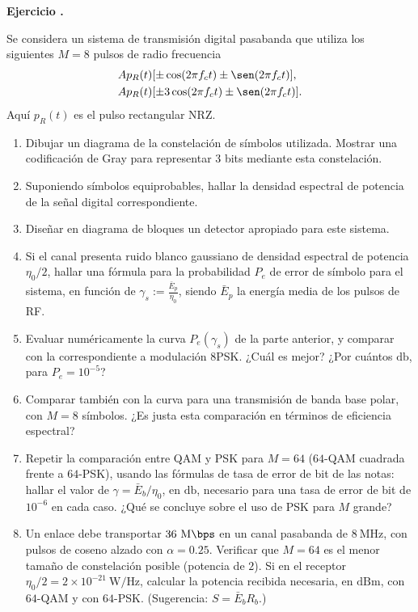\documentclass[a4paper,11pt]{article}
\newcounter{numejer}[section]
\newenvironment{ejercicio}[1][]{
\refstepcounter{numejer}
\noindent \large \textbf{Ejercicio \arabic{section}.\arabic{numejer}} \ifthenelse{\equal{#1}{}}{}{\emph{(#1)}}

\smallskip
}{
\bigskip
}
\begin{document}
\begin{ejercicio}
Se considera un sistema de transmisión digital pasabanda que utiliza los siguientes $M=8$ pulsos de radio frecuencia 
\begin{align*} & A p_R(t)[\pm \cos(2\pi f_c t) \pm \sen(2\pi f_c t)],\\ & A p_R(t)[\pm 3\cos(2\pi f_c t)
\pm \sen(2\pi f_c t)].
\end{align*}
Aquí $p_R(t)$ es el pulso rectangular NRZ. 

\begin{enumerate}
\item Dibujar un diagrama de la constelación de símbolos
utilizada. Mostrar una codificación de Gray para representar 3
bits mediante esta constelación.
\item Suponiendo símbolos equiprobables, hallar la densidad
espectral de potencia de la señal digital correspondiente.
\item Diseñar en diagrama de bloques un detector apropiado para este sistema.
\item Si el canal presenta ruido blanco gaussiano de densidad espectral de
potencia $\eta_0/2$, hallar una fórmula para la probabilidad $P_e$
de error de símbolo para el sistema, en función de
$\gamma_s:=\frac{\bar{E}_p}{\eta_0}$, siendo $\bar{E}_p$ la energía
media de los pulsos de RF.
\item Evaluar numéricamente la curva $P_e(\gamma_s)$ de la parte anterior, y comparar con
la correspondiente a modulación 8PSK. ¿Cuál es mejor? ¿Por cuántos $\unit{\decibel}$, para $P_e=10^{-5}$?
\item Comparar también con la curva para una transmisión de banda
base polar, con $M=8$ símbolos. ¿Es justa esta comparación en
términos de eficiencia espectral?
\item Repetir la comparación entre QAM y PSK para $M=64$ ($64$-QAM cuadrada frente a $64$-PSK), usando las fórmulas de tasa de error de bit de las notas: hallar el valor de $\gamma=\bar E_b/\eta_0$, en $\unit{\decibel}$, necesario para una tasa de error de bit de $10^{-6}$ en cada caso. ¿Qué se concluye sobre el uso de PSK para $M$ grande?
\item Un enlace debe transportar $36\ \unit{\mega\bps}$ en un canal pasabanda de $8\ \unit{\mega\hertz}$, con pulsos de coseno alzado con $\alpha=0.25$. Verificar que $M=64$ es el menor tamaño de constelación posible (potencia de $2$). Si en el receptor $\eta_0/2=2\times10^{-21}\ \unit{\watt/\hertz}$, calcular la potencia recibida necesaria, en $\mathrm{dBm}$, con $64$-QAM y con $64$-PSK. (Sugerencia: $S=\bar E_bR_b$.)
\end{enumerate}
\end{ejercicio}
\end{document}
